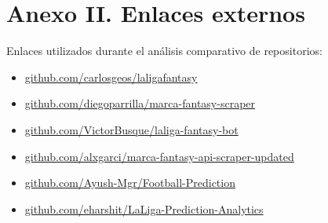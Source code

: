 \section*{Anexo II. Enlaces externos}
Enlaces utilizados durante el análisis comparativo de repositorios:

\begin{itemize}
\item \href{https://github.com/carlosgeos/laligafantasy}{github.com/carlosgeos/laligafantasy}
\item \href{https://github.com/diegoparrilla/marca-fantasy-scraper}{github.com/diegoparrilla/marca-fantasy-scraper}
\item \href{https://github.com/VictorBusque/laliga-fantasy-bot}{github.com/VictorBusque/laliga-fantasy-bot}
\item \href{https://github.com/alxgarci/marca-fantasy-api-scraper-updated}{github.com/alxgarci/marca-fantasy-api-scraper-updated}
\item \href{https://github.com/Ayush-Mgr/Football-Prediction}{github.com/Ayush-Mgr/Football-Prediction}
\item \href{https://github.com/eharshit/LaLiga-Prediction-Analytics}{github.com/eharshit/LaLiga-Prediction-Analytics}
\end{itemize}
